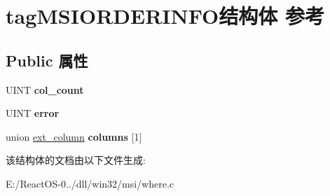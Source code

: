 \hypertarget{structtag_m_s_i_o_r_d_e_r_i_n_f_o}{}\section{tag\+M\+S\+I\+O\+R\+D\+E\+R\+I\+N\+F\+O结构体 参考}
\label{structtag_m_s_i_o_r_d_e_r_i_n_f_o}
\subsection*{Public 属性}
\begin{DoxyCompactItemize}
\item 
\mbox{\label{structtag_m_s_i_o_r_d_e_r_i_n_f_o_ab5afeda552146c013289bc9f4cf2380a}} 
U\+I\+NT {\bfseries col\+\_\+count}
\item 
\mbox{\label{structtag_m_s_i_o_r_d_e_r_i_n_f_o_ab197d8e55c18237b9c4cee08a35919ba}} 
U\+I\+NT {\bfseries error}
\item 
\mbox{\label{structtag_m_s_i_o_r_d_e_r_i_n_f_o_a2a61dc6a4f60ba63519388878fdc5f1b}} 
union \hyperlink{unionext__column}{ext\+\_\+column} {\bfseries columns} \mbox{[}1\mbox{]}
\end{DoxyCompactItemize}


该结构体的文档由以下文件生成\+:\begin{DoxyCompactItemize}
\item 
E\+:/\+React\+O\+S-\/0../dll/win32/msi/where.\+c\end{DoxyCompactItemize}
